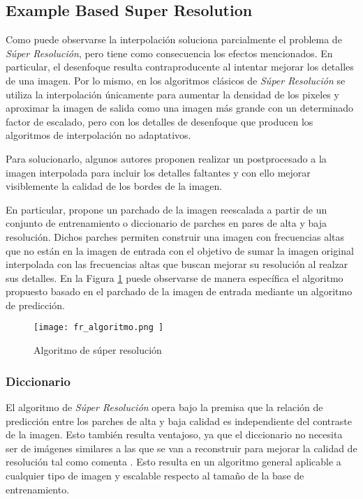 \subsection{Example Based Super Resolution}
\noindent
Como puede observarse la interpolación soluciona parcialmente el problema de
\emph{Súper Resolución}, pero tiene como consecuencia los efectos mencionados. En
particular, el desenfoque resulta contraproducente al intentar mejorar los 
detalles de una imagen. Por lo mismo, en los algoritmos clásicos de \emph{Súper Resolución}
se utiliza la interpolación únicamente para aumentar la densidad de los pixeles
y aproximar la imagen de salida como una imagen más grande con un determinado 
factor de escalado, pero con los detalles de desenfoque que producen los 
algoritmos de interpolación no adaptativos. 

Para solucionarlo, algunos autores proponen realizar un postprocesado a la imagen 
interpolada para incluir los detalles faltantes y con ello mejorar visiblemente 
la calidad de los bordes de la imagen. 

En particular, \cite{freeman} propone un parchado de la imagen reescalada a partir
de un conjunto de entrenamiento o diccionario de parches en pares de alta
y baja resolución. Dichos parches permiten construir una imagen con frecuencias
altas que no están en la imagen de entrada con el objetivo de sumar la imagen
original interpolada con las frecuencias altas que buscan mejorar su resolución
al realzar sus detalles. En la Figura \ref{fig:fr_algoritmo} puede observarse de
manera específica el algoritmo propuesto basado en el parchado de la imagen de 
entrada mediante un algoritmo de predicción.

\begin{figure}[H]
    \texttt{[image:  fr\_algoritmo.png ]}
    \centering
    \caption{ Algoritmo de súper resolución }
    \label{fig:fr_algoritmo}
\end{figure}

\subsubsection{Diccionario}
\noindent
El algoritmo de \emph{Súper Resolución} \cite{freeman}
opera bajo la premisa que la relación
de predicción entre los parches de alta y baja calidad es independiente del 
contraste de la imagen. Esto también resulta ventajoso, ya que el diccionario 
no necesita ser de imágenes similares a las que se van a reconstruir para 
mejorar la calidad de resolución tal como comenta \cite{diccionario_shuji}.
Esto resulta en un algoritmo general aplicable a cualquier tipo de imagen
y escalable respecto al tamaño de la base de entrenamiento.

